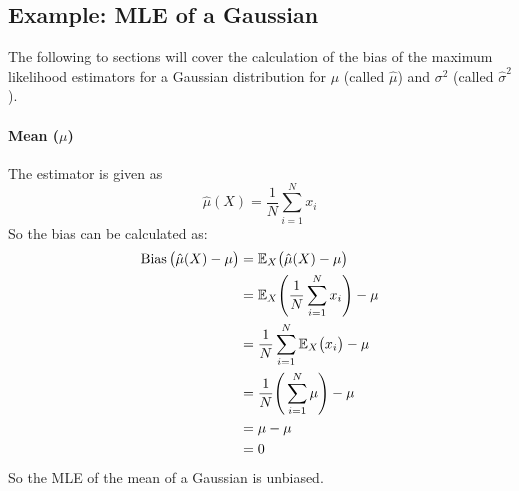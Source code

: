 		\subsection{Example: MLE of a Gaussian} %
			The following to sections will cover the calculation of the bias of the maximum likelihood estimators for a Gaussian distribution for \(\mu\) (called \(\hat{\mu}\)) and \(\sigma^2\) (called \(\hat{\sigma}^2\)).

			\paragraph{Mean (\(\mu\))}
				The estimator is given as
				\begin{equation}
					\hat{\mu}(X) = \frac{1}{N} \sum_{i = 1}^{N} x_i
				\end{equation}
				So the bias can be calculated as:
				\begin{align}
					\operatorname{Bias}\big(\hat{\mu}(X) - \mu\big) & = \mathbb{E}_X\big(\hat{\mu}(X) - \mu\big)                         \\
					                                  & = \mathbb{E}_X\Bigg( \frac{1}{N} \sum_{i = 1}^{N} x_i \Bigg) - \mu \\
					                                  & = \frac{1}{N} \sum_{i = 1}^{N} \mathbb{E}_X\big(x_i\big) - \mu     \\
					                                  & = \frac{1}{N} \Bigg( \sum_{i = 1}^{N} \mu \Bigg) - \mu     \\
					                                  & = \mu - \mu                                                \\
					                                  & = 0
				\end{align}
				So the MLE of the mean of a Gaussian is unbiased.

